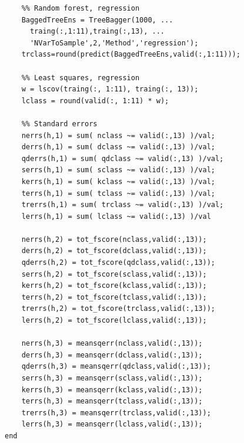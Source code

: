 \documentclass[twoside]{article}
\begin{document}
\begin{multicols}{2}
{\begin{verbatim}
    %% Random forest, regression
    BaggedTreeEns = TreeBagger(1000, ...
      traing(:,1:11),traing(:,13), ...
      'NVarToSample',2,'Method','regression');    
    trclass=round(predict(BaggedTreeEns,valid(:,1:11)));
        
    %% Least squares, regression
    w = lscov(traing(:, 1:11), traing(:, 13));
    lclass = round(valid(:, 1:11) * w);

    %% Standard errors
    nerrs(h,1) = sum( nclass ~= valid(:,13) )/val;
    derrs(h,1) = sum( dclass ~= valid(:,13) )/val;
    qderrs(h,1) = sum( qdclass ~= valid(:,13) )/val;
    serrs(h,1) = sum( sclass ~= valid(:,13) )/val;
    kerrs(h,1) = sum( kclass ~= valid(:,13) )/val;
    terrs(h,1) = sum( tclass ~= valid(:,13) )/val;
    trerrs(h,1) = sum( trclass ~= valid(:,13) )/val;
    lerrs(h,1) = sum( lclass ~= valid(:,13) )/val

    nerrs(h,2) = tot_fscore(nclass,valid(:,13));
    derrs(h,2) = tot_fscore(dclass,valid(:,13));
    qderrs(h,2) = tot_fscore(qdclass,valid(:,13));
    serrs(h,2) = tot_fscore(sclass,valid(:,13));
    kerrs(h,2) = tot_fscore(kclass,valid(:,13));
    terrs(h,2) = tot_fscore(tclass,valid(:,13));
    trerrs(h,2) = tot_fscore(trclass,valid(:,13));
    lerrs(h,2) = tot_fscore(lclass,valid(:,13));

    nerrs(h,3) = meansqerr(nclass,valid(:,13));
    derrs(h,3) = meansqerr(dclass,valid(:,13));
    qderrs(h,3) = meansqerr(qdclass,valid(:,13));
    serrs(h,3) = meansqerr(sclass,valid(:,13));
    kerrs(h,3) = meansqerr(kclass,valid(:,13));
    terrs(h,3) = meansqerr(tclass,valid(:,13));
    trerrs(h,3) = meansqerr(trclass,valid(:,13));
    lerrs(h,3) = meansqerr(lclass,valid(:,13));
end

\end{verbatim}

}

\end{multicols}
\end{document}
